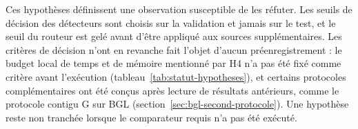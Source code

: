 
Ces hypothèses définissent une observation susceptible de les réfuter. Les seuils de décision des détecteurs sont choisis sur la validation et jamais sur le test, et le seuil du routeur est gelé avant d'être appliqué aux sources supplémentaires. Les critères de décision n'ont en revanche fait l'objet d'aucun préenregistrement : le budget local de temps et de mémoire mentionné par H4 n'a pas été fixé comme critère avant l'exécution (tableau~\ref{tab:statut-hypotheses}), et certains protocoles complémentaires ont été conçus après lecture de résultats antérieurs, comme le protocole contigu G sur BGL (section~\ref{sec:bgl-second-protocole}). Une hypothèse reste non tranchée lorsque le comparateur requis n'a pas été exécuté.
